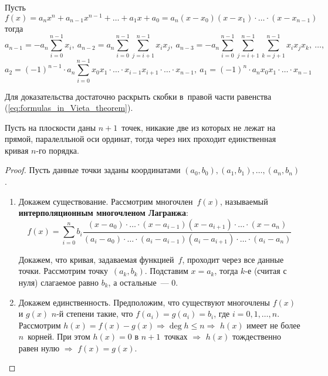 \begin{theorem}
Пусть 
\begin{equation}
\label{eq:formulas_in_Vieta_theorem}
f(x) = a_n x^n + a_{n-1} x^{n-1} + \ldots + a_1 x + a_0 = a_n(x - x_0)(x - x_1) \cdot \ldots \cdot (x - x_{n-1})
\end{equation}
тогда
\begin{equation*}
a_{n-1} = -a_n \sum_{i=0}^{n-1} x_i, \
a_{n-2} = a_n \sum_{i=0}^{n-1} \sum_{j=i+1}^{n-1} x_i x_j, \
a_{n-3} = -a_n \sum_{i=0}^{n-1} \sum_{j=i+1}^{n-1} \sum_{k=j+1}^{n-1} x_i x_j x_k, \ \ldots,
\end{equation*}
\begin{equation*}
a_2 = (-1)^{n-1} \cdot a_n \sum_{i=0}^{n-1} x_0 x_1 \cdot \ldots \cdot x_{i-1} x_{i+1} \cdot \ldots \cdot x_{n-1}, \
a_1 = (-1)^n \cdot a_n x_0 x_1 \cdot \ldots \cdot x_{n-1}
\end{equation*}
\end{theorem}%
Для доказательства достаточно раскрыть скобки в~правой части равенства (\ref*{eq:formulas_in_Vieta_theorem}).

\begin{theorem}
Пусть на плоскости даны $n + 1$~точек, никакие две из которых не лежат на прямой, паралелльной оси ординат, тогда через них проходит единственная кривая $n$-го порядка.
\end{theorem}
\begin{proof}
Пусть данные точки заданы координатами $(a_0, b_0), (a_1, b_1), \ldots, (a_n, b_n)$.
\begin{enumerate}
	\item Докажем существование.
	Рассмотрим многочлен~$f(x)$, называемый \textbf{интерполяционным многочленом Лагранжа}:
	\begin{equation*}
	f(x) = \sum_{i=0}^n b_i \frac
	{(x - a_0) \cdot \ldots \cdot (x - a_{i-1})(x - a_{i+1}) \cdot \ldots \cdot (x - a_n)}
	{(a_i - a_0) \cdot \ldots \cdot (a_i - a_{i-1})(a_i - a_{i+1}) \cdot \ldots \cdot (a_i - a_n)}
	\end{equation*}
	
	Докажем, что кривая, задаваемая функцией~$f$, проходит через все данные точки.
	Рассмотрим точку~$(a_k, b_k)$.
	Подставим $x = a_k$, тогда $k$-е (считая с нуля) слагаемое равно $b_k$, а остальные~--- 0.
	
	\item Докажем единственность.
	Предположим, что существуют многочлены $f(x)$ и $g(x)$ $n$-й степени такие, что $f(a_i) = g(a_i) = b_i$, где $i = 0, 1, \ldots, n$.
	Рассмотрим $h(x) = f(x) - g(x) \Rightarrow \deg h \leqslant n \Rightarrow$ $h(x)$ имеет не более $n$~корней.
	При этом $h(x) = 0$ в $n + 1$~точках $\Rightarrow$ $h(x)$ тождественно равен нулю $\Rightarrow$ $f(x) = g(x)$.
\end{enumerate}
\end{proof}